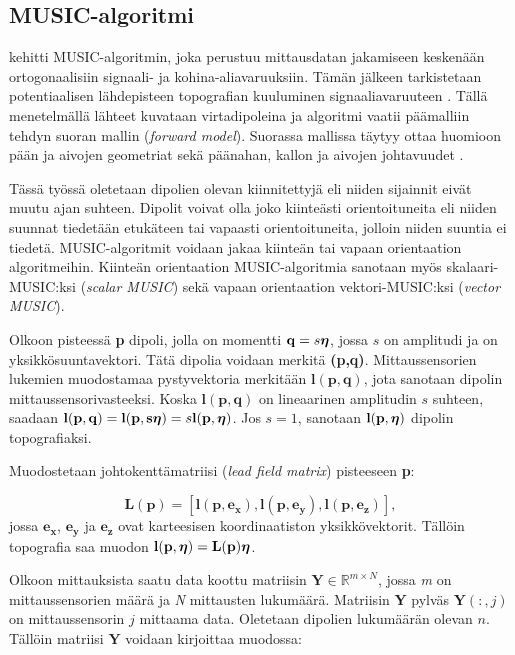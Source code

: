 \subsection{MUSIC-algoritmi}
\cite{Schmidt1986MultipleEstimation} kehitti MUSIC-algoritmin, joka perustuu mittausdatan jakamiseen keskenään ortogonaalisiin signaali- ja kohina-aliavaruuksiin. Tämän jälkeen tarkistetaan potentiaalisen lähdepisteen topografian kuuluminen signaaliavaruuteen \citep{Mosher1999SourceMUSIC}. Tällä menetelmällä lähteet kuvataan virtadipoleina ja algoritmi vaatii päämalliin tehdyn suoran mallin (\textit{forward model}). Suorassa mallissa täytyy ottaa huomioon pään ja aivojen geometriat sekä päänahan, kallon ja aivojen johtavuudet \citep[s. 87]{hansen2010meg}.

Tässä työssä oletetaan dipolien olevan kiinnitettyjä eli niiden sijainnit eivät muutu ajan suhteen. Dipolit voivat olla joko kiinteästi orientoituneita eli niiden suunnat tiedetään etukäteen tai vapaasti orientoituneita, jolloin niiden suuntia ei tiedetä. MUSIC-algoritmit voidaan jakaa kiinteän tai vapaan orientaation algoritmeihin. Kiinteän orientaation MUSIC-algoritmia sanotaan myös skalaari-MUSIC:ksi (\textit{scalar MUSIC}) sekä vapaan orientaation vektori-MUSIC:ksi (\textit{vector MUSIC}). \citep{Makela2018TruncatedLocalization}

Olkoon pisteessä \textbf{p} dipoli, jolla on momentti $\mathbf{q} = s\text{\boldmath$\eta$}$, jossa $s$ on amplitudi ja \text{\boldmath$\eta$} on yksikkösuuntavektori. Tätä dipolia voidaan merkitä \textbf{(p,q)}. Mittaussensorien lukemien muodostamaa pystyvektoria merkitään $\mathbf{l(p,q)}$, jota sanotaan dipolin mittaussensorivasteeksi. Koska $\mathbf{l(p,q)}$ on lineaarinen amplitudin $s$ suhteen, saadaan $\mathbf{l(p,q)} = \mathbf{l(p,s\text{\boldmath$\eta$})} = s\mathbf{l(p,\text{\boldmath$\eta$})}$. Jos $s=1$, sanotaan $\mathbf{l(p,\text{\boldmath$\eta$})}$ dipolin topografiaksi.

Muodostetaan johtokenttämatriisi (\textit{lead field matrix}) pisteeseen \textbf{p}:

\begin{equation}
    \mathbf{L(p) = [l(p,e_x),l(p,e_y),l(p,e_z)]},
\end{equation}
jossa $\mathbf{e_x}$, $\mathbf{e_y}$ ja $\mathbf{e_z}$ ovat karteesisen koordinaatiston yksikkövektorit. Tällöin topografia saa muodon $\mathbf{l(p},\text{\boldmath$\eta$})=\mathbf{L(p})\mathbf{\text{\boldmath$\eta$}}$.

Olkoon mittauksista saatu data koottu matriisin $\mathbf{Y}\in \mathbb{R}^{m\times N}$, jossa \textit{m} on mittaussensorien määrä ja \textit{N} mittausten lukumäärä. Matriisin \textbf{Y} pylväs $\mathbf{Y}(:,j)$ on mittaussensorin $j$ mittaama data. Oletetaan dipolien lukumäärän olevan $n$. Tällöin matriisi $\mathbf{Y}$ voidaan kirjoittaa muodossa:

